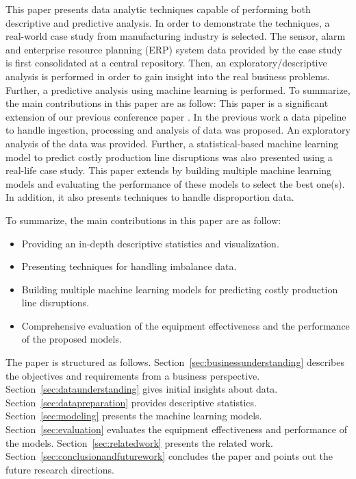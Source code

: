 \documentclass[runningheads]{llncs}
\begin{document}
This paper presents data analytic techniques capable of performing both descriptive and predictive analysis. In order to demonstrate the techniques, a real-world case study from manufacturing industry is selected. The sensor, alarm and enterprise resource planning (ERP) system data provided by the case study is first consolidated at a central repository. Then, an exploratory/descriptive analysis is performed in order to gain insight into the real business problems. Further, a predictive analysis using machine learning is performed. To summarize, the main contributions in this paper are as follow:
\fi
This paper is a significant extension of our previous conference paper \cite{nadeem}. In the previous work a data pipeline to handle ingestion, processing and analysis of data was proposed. An exploratory analysis of the data was provided. Further, a statistical-based machine learning model to predict costly production line disruptions was also presented using a real-life case study. This paper extends \cite{nadeem} by building multiple machine learning models and evaluating the performance of these models to select the best one(s). In addition, it also presents techniques to handle disproportion data.

To summarize, the main contributions in this paper are as follow:
\begin{itemize} 
\item Providing an in-depth descriptive statistics and visualization. 

\item Presenting techniques for handling imbalance data.

\item Building multiple machine learning models for predicting costly production line disruptions.

\item Comprehensive evaluation of the equipment effectiveness and the performance of the proposed models.
\end{itemize} 

The paper is structured as follows. Section~\ref{sec:businessunderstanding} describes the objectives and requirements from a business perspective. Section~\ref{sec:dataunderstanding} gives initial insights about data. Section~\ref{sec:datapreparation} provides descriptive statistics. Section~\ref{sec:modeling} presents
the machine learning models. Section~\ref{sec:evaluation} evaluates the equipment effectiveness and performance of the models. Section~\ref{sec:relatedwork} presents the related work. Section~\ref{sec:conclusionandfuturework} concludes the paper and points out the future research directions.
\end{document}
